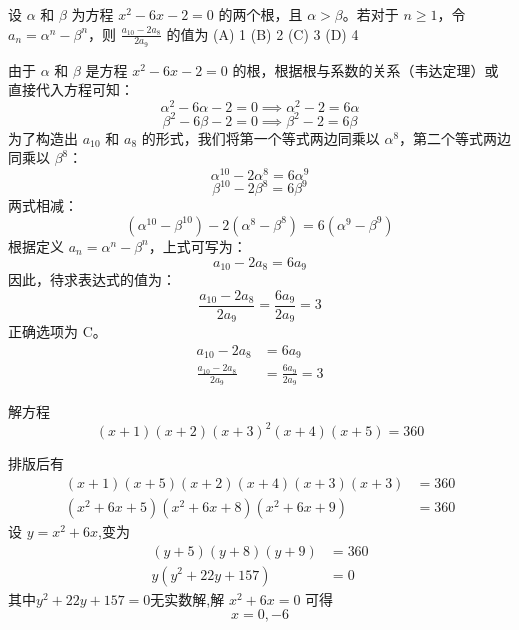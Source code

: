 \begin{questions}
\question 设 $\alpha$ 和 $\beta$ 为方程 $x^2 - 6x - 2 = 0$ 的两个根，且 $\alpha > \beta$。若对于 $n \ge 1$，令 $a_n = \alpha^n - \beta^n$，则 $\frac{a_{10} - 2a_8}{2a_9}$ 的值为
(A) 1
(B) 2
(C) 3
(D) 4

\begin{solution}
由于 $\alpha$ 和 $\beta$ 是方程 $x^2 - 6x - 2 = 0$ 的根，根据根与系数的关系（韦达定理）或直接代入方程可知：
\[
\alpha^2 - 6\alpha - 2 = 0 \implies \alpha^2 - 2 = 6\alpha
\]
\[
\beta^2 - 6\beta - 2 = 0 \implies \beta^2 - 2 = 6\beta
\]
为了构造出 $a_{10}$ 和 $a_8$ 的形式，我们将第一个等式两边同乘以 $\alpha^8$，第二个等式两边同乘以 $\beta^8$：
\[
\alpha^{10} - 2\alpha^8 = 6\alpha^9
\]
\[
\beta^{10} - 2\beta^8 = 6\beta^9
\]
两式相减：
\[
(\alpha^{10} - \beta^{10}) - 2(\alpha^8 - \beta^8) = 6(\alpha^9 - \beta^9)
\]
根据定义 $a_n = \alpha^n - \beta^n$，上式可写为：
\[
a_{10} - 2a_8 = 6a_9
\]
因此，待求表达式的值为：
\[
\frac{a_{10} - 2a_8}{2a_9} = \frac{6a_9}{2a_9} = 3
\]
正确选项为 C。
\begin{align*}
a_{10} - 2a_8 &= 6a_9 \\
\frac{a_{10} - 2a_8}{2a_9} &= \frac{6a_9}{2a_9} = 3
\end{align*}
\end{solution}

    \question 解方程
    \[ 
    (x+1)(x+2)(x+3)^2(x+4)(x+5)=360 
    \]
    \begin{solution}   
        排版后有
        \begin{align*}
        (x+1)(x+5)(x+2)(x+4)(x+3)(x+3)&=360 \\
        (x^2+6x+5)(x^2+6x+8)(x^2+6x+9)&=360
        \end{align*}
        设 $y=x^2+6x$,变为
        \begin{align*}
        (y+5)(y+8)(y+9)&=360\\
        y(y^2+22y+157)&=0
        \end{align*}
        其中$y^2+22y+157=0$无实数解,解 $x^2+6x=0$ 可得 
        \[
        x=0, -6
        \]
    \end{solution}


\end{questions}
